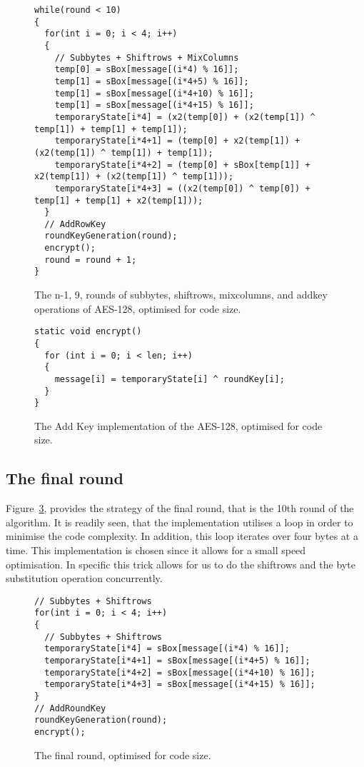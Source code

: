 \documentclass[Report.tex]{subfiles}
\begin{document}
\begin{figure}[h]
\begin{lstlisting}[basicstyle=\tiny]
while(round < 10)
{
  for(int i = 0; i < 4; i++)
  {
  	// Subbytes + Shiftrows + MixColumns
    temp[0] = sBox[message[(i*4) % 16]];
    temp[1] = sBox[message[(i*4+5) % 16]];
    temp[1] = sBox[message[(i*4+10) % 16]];
    temp[1] = sBox[message[(i*4+15) % 16]];			
    temporaryState[i*4] = (x2(temp[0]) + (x2(temp[1]) ^ temp[1]) + temp[1] + temp[1]);
    temporaryState[i*4+1] = (temp[0] + x2(temp[1]) + (x2(temp[1]) ^ temp[1]) + temp[1]);
    temporaryState[i*4+2] = (temp[0] + sBox[temp[1]] + x2(temp[1]) + (x2(temp[1]) ^ temp[1]));
    temporaryState[i*4+3] = ((x2(temp[0]) ^ temp[0]) + temp[1] + temp[1] + x2(temp[1]));
  }	
  // AddRowKey
  roundKeyGeneration(round);
  encrypt();
  round = round + 1;
}
\end{lstlisting}
\caption{\label{N1code} The n-1, 9, rounds of subbytes, shiftrows, mixcolumns, and addkey operations of AES-128, optimised for code size.}
\end{figure}

\begin{figure}[h]
\begin{lstlisting}[basicstyle=\tiny]
static void encrypt()
{
  for (int i = 0; i < len; i++)
  {
    message[i] = temporaryState[i] ^ roundKey[i];
  }
}
\end{lstlisting}
\caption{\label{AKcode} The Add Key implementation of the AES-128, optimised for code size.}
\end{figure}

\subsection{The final round}
Figure~\ref{FRcode}, provides the strategy of the 
final round, that is the 10th round of the algorithm.
It is readily seen, that the implementation utilises a loop
in order to minimise the code complexity. In addition, this loop
iterates over four bytes at a time. This implementation is chosen
since it allows for a small speed optimisation. In specific this 
trick allows for us to do the shiftrows and the byte substitution operation 
concurrently.

\begin{figure}[h]
\begin{lstlisting}[basicstyle=\tiny]
// Subbytes + Shiftrows
for(int i = 0; i < 4; i++)
{
  // Subbytes + Shiftrows
  temporaryState[i*4] = sBox[message[(i*4) % 16]];
  temporaryState[i*4+1] = sBox[message[(i*4+5) % 16]];
  temporaryState[i*4+2] = sBox[message[(i*4+10) % 16]];
  temporaryState[i*4+3] = sBox[message[(i*4+15) % 16]];
}
// AddRoundKey
roundKeyGeneration(round);
encrypt();
\end{lstlisting}
\caption{\label{FRcode} The final round, optimised for code size.}
\end{figure}
\end{document}
